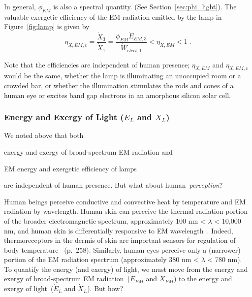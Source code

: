 \documentclass[energies,article,accept,moreauthors,pdftex]{Definitions/mdpi}\usepackage[]{graphicx}\usepackage[]{color}
\newcommand{\humaneyesensitivity}{380 nm < $\lambda$ < 780 nm}
\newcommand{\enaex}{energy and exergy}
\begin{document}
In general, $\phi_{EM}$ is also a spectral quantity.
(See Section~\ref{sec:phi_light}).
The valuable exergetic efficiency of the EM radiation emitted by the lamp in Figure~\ref{fig:lamp} is given by
\begin{equation} \label{eq:eta_X_v}
  \eta_{X,EM,v} = \frac{\dot{X}_3}{\dot{X}_1} 
              = \frac{\phi_{EM} \dot{E}_{EM,3} }{\dot{W}_{elect,1}} < \eta_{X,EM} < 1 \; .
\end{equation}

Note that the efficiencies are independent of human presence;
$\eta_{X,EM}$ and $\eta_{X,EM,v}$ would be the same, 
whether the lamp is illuminating
an unoccupied room or a crowded bar, or
whether the illumination stimulates the rods and cones of a human eye or
excites band gap electrons in an amorphous silicon solar cell.


\subsubsection{Energy and Exergy of Light ($\dot{E}_{L}$ and $\dot{X}_{L}$)} 
\label{sec:human_perception_of_EM_radiation}

We noted above that both
%
\begin{enumerate*}[label={(\alph*)}]

  \item \enaex{} of broad-spectrum EM radiation and

  \item EM energy and exergetic efficiency of lamps

\end{enumerate*}
%
are independent of human presence.
But what about \mbox{human \emph{perception}?}

Human beings perceive conductive and convective heat by temperature and EM radiation by wavelength.
Human skin can perceive the thermal radiation portion of the broader electromagnetic spectrum,
approximately 100 nm < $\lambda$ < 10,000 nm, and 
human skin is differentially responsive to EM wavelength~\citep{Anderson:1981aa}.  
Indeed, thermoreceptors in the dermis of skin are important sensors
for regulation of body temperature~\cite{Jones:2016aa} (p.~258). Similarly, human eyes perceive only a (narrower) portion of the EM radiation spectrum
(approximately \humaneyesensitivity).
To quantify the energy (and exergy) of light, 
we must move from the \enaex{} of broad-spectrum EM radiation~($\dot{E}_{EM}$ and $\dot{X}_{EM}$)
to the \enaex{} of light~($\dot{E}_{L}$ and $\dot{X}_{L}$). 
But how?
\end{document}
